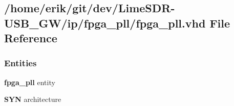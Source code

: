 \subsection{/home/erik/git/dev/\+Lime\+S\+D\+R-\/\+U\+S\+B\+\_\+\+G\+W/ip/fpga\+\_\+pll/fpga\+\_\+pll.vhd File Reference}
\label{fpga__pll_8vhd}
\subsubsection*{Entities}
\begin{DoxyCompactItemize}
\item 
{\bf fpga\+\_\+pll} entity
\item 
{\bf S\+YN} architecture
\end{DoxyCompactItemize}
